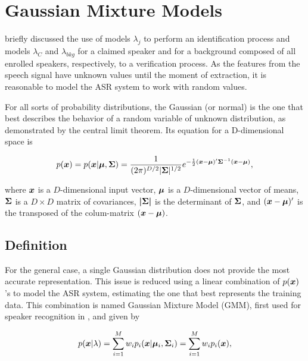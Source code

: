 \chapter{Gaussian Mixture Models}
\label{ch:gmm}

 briefly discussed the use of models $\lambda_j$ to perform an identification process and models $\lambda_{C}$ and $\lambda_{bkg}$ for a claimed speaker and for a background composed of all enrolled speakers, respectively, to a verification process. As the features from the speech signal have unknown values until the moment of extraction, it is reasonable to model the ASR system to work with random values.

For all sorts of probability distributions, the Gaussian (or normal) is the one that best describes the behavior of a random variable of unknown distribution, as demonstrated by the central limit theorem. Its equation for a D-dimensional space is

\begin{equation}
    \pdf{\dvec{x}} = \postpdf{\dvec{x}}{\dvec{\mu},\dvec{\Sigma}} = \dgaussian{x}{\mu}{\Sigma},
    \label{eq:gaussian}
\end{equation}

\noindent where $\boldsymbol{x}$ is a $D$-dimensional input vector, $\boldsymbol{\mu}$ is a $D$-dimensional vector of means, $\boldsymbol{\Sigma}$ is a $D \times D$ matrix of covariances, $\boldsymbol{|\Sigma|}$ is the determinant of $\boldsymbol{\Sigma}$, and $(\boldsymbol{x} - \boldsymbol{\mu})'$ is the transposed of the colum-matrix $(\boldsymbol{x} - \boldsymbol{\mu})$.

\section{Definition}
\label{sec:gmm-definition}

For the general case, a single Gaussian distribution does not provide the most accurate representation. This issue is reduced using a linear combination of $p(\boldsymbol{x})$'s to model the ASR system, estimating the one that best represents the training data. This combination is named Gaussian Mixture Model (GMM), first used for speaker recognition in , and given by

\begin{equation}
    \postpdf{\dvec{x}}{\lambda} = \sum_{i=1}^M w_i\postpdfi{\dvec{x}}{\dvec{\mu}_i, \dvec{\Sigma}_i} = \sum_{i=1}^M w_i\pdfi{\dvec{x}},
    \label{eq:gaussian_mixture}
\end{equation}

